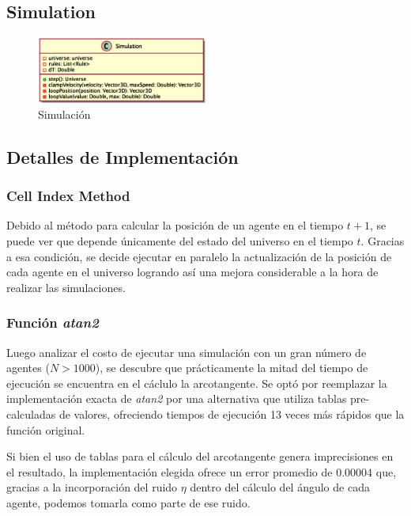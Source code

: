 \documentclass[a4paper]{article}
\begin{document}
        \subsection{Simulation}

            \begin{figure}[H]
                \centering
                \includegraphics[width=0.5\textwidth]{../imgs/simulation}
                \caption{Simulación}
                \label{fig:simulation_implementation}
            \end{figure}

        \subsection{Detalles de Implementación}

            \subsubsection{Cell Index Method}

                Debido al método para calcular la posición de un agente en el tiempo $t + 1$, se puede ver que depende únicamente del estado del universo en el tiempo $t$. Gracias a esa condición, se decide ejecutar en paralelo la actualización de la posición de cada agente en el universo logrando así una mejora considerable a la hora de realizar las simulaciones.

            \subsubsection{Función \textit{atan2}}

                Luego analizar el costo de ejecutar una simulación con un gran número de agentes ($N > 1000$), se descubre que prácticamente la mitad del tiempo de ejecución se encuentra en el cáclulo la arcotangente. Se optó por reemplazar la implementación exacta de \textit{atan2} por una alternativa \cite{FastAcos} que utiliza tablas pre-calculadas de valores, ofreciendo tiempos de ejecución 13 veces más rápidos que la función original.

                Si bien el uso de tablas para el cálculo del arcotangente genera imprecisiones en el resultado, la implementación elegida ofrece un error promedio de $0.00004$ que, gracias a la incorporación del ruido $\eta$ dentro del cálculo del ángulo de cada agente, podemos tomarla como parte de ese ruido.
\end{document}
